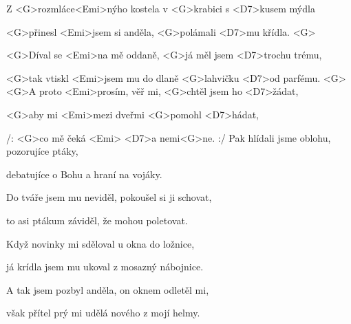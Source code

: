 

\zs
Z <G>rozmláce<Emi>nýho kostela
v <G>krabici s <D7>kusem mýdla

<G>přinesl <Emi>jsem si anděla,
<G>polámali <D7>mu křídla. <G>

<G>Díval se <Emi>na mě oddaně,
<G>já měl jsem <D7>trochu trému,

<G>tak vtiskl <Emi>jsem mu do dlaně 
<G>lahvičku <D7>od parfému. <G>
\ks
\zr
<G>A proto <Emi>prosím, věř mi,
<G>chtěl jsem ho <D7>žádat,

<G>aby mi <Emi>mezi dveřmi
<G>pomohl <D7>hádat,

/: <G>co mě čeká <Emi> <D7>a nemi<G>ne. :/
\kr
\zs
Pak hlídali jsme oblohu, pozorujíce ptáky,

debatujíce o Bohu a hraní na vojáky.

Do tváře jsem mu neviděl, pokoušel si ji schovat,

to asi ptákum záviděl, že mohou poletovat.
\ks

\zr
\kr

\zs
Když novinky mi sděloval u okna do ložnice,

já krídla jsem mu ukoval z mosazný nábojnice.

A tak jsem pozbyl anděla, on oknem odletěl mi,

však přítel prý mi udělá nového z mojí helmy.
\ks

\zr
\kr
\kp
